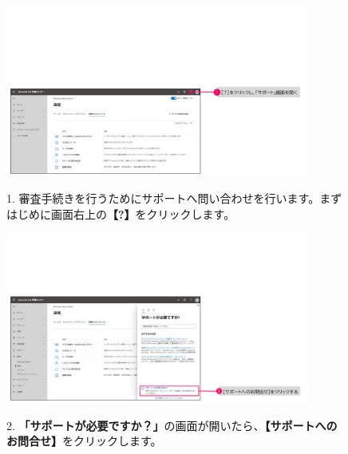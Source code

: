 \begin{figure}[h]
    \begin{minipage}{0.6\textwidth}
        \vspace{-2cm}
        \includegraphics[width=10cm]{figures/O365A1_request00.png}
    \end{minipage}
    \begin{minipage}{0.4\textwidth}
       1. 審査手続きを行うためにサポートへ問い合わせを行います。まずはじめに画面右上の\textbf{【?】}をクリックします。
    \end{minipage}
\end{figure}

\begin{figure}[h]
    \begin{minipage}{0.6\textwidth}
        \vspace{-1cm}
        \includegraphics[width=10cm]{figures/O365A1_request01.png}
    \end{minipage}
    \begin{minipage}{0.4\textwidth}
       2. \textbf{「サポートが必要ですか？」}の画面が開いたら、\textbf{【サポートへのお問合せ】}をクリックします。
    \end{minipage}
\end{figure}

